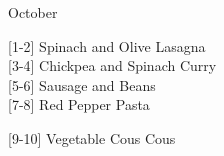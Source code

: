 		\begin{menu}{October}
    
    \begin{recipelist}
    
        {\scriptsize[1-2]} Spinach and Olive Lasagna\\
        {\scriptsize[3-4]} Chickpea and Spinach Curry\\
        {\scriptsize[5-6]} Sausage and Beans\\
        {\scriptsize[7-8]} Red Pepper Pasta\\%
    \end{recipelist}%
    \begin{recipelist}
    
        {\scriptsize[9-10]} Vegetable Cous Cous\\
    \end{recipelist}\par%
  

\end{menu}
